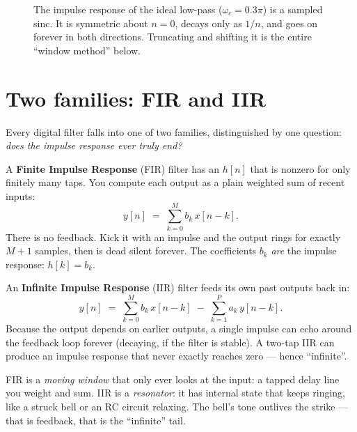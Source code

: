 \begin{figure}[H]
\centering
{}
\caption{The impulse response of the ideal low-pass ($\omega_c = 0.3\pi$) is a
sampled sinc. It is symmetric about $n=0$, decays only as $1/n$, and goes on
forever in both directions. Truncating and shifting it is the entire ``window
method'' below.}
\label{ch16:fig-ideal-sinc}
\end{figure}

\section{Two families: FIR and IIR}
\label{ch16:fir-iir}

Every digital filter falls into one of two families, distinguished by one
question: \emph{does the impulse response ever truly end?}

A \textbf{Finite Impulse Response} (FIR) filter has an $h[n]$ that is nonzero for
only finitely many taps. You compute each output as a plain weighted sum of recent
inputs:
\[
y[n] \;=\; \sum_{k=0}^{M} b_k\, x[n-k].
\]
There is no feedback. Kick it with an impulse and the output rings for exactly
$M+1$ samples, then is dead silent forever. The coefficients $b_k$ \emph{are} the
impulse response: $h[k] = b_k$.

An \textbf{Infinite Impulse Response} (IIR) filter feeds its own past outputs
back in:
\[
y[n] \;=\; \sum_{k=0}^{M} b_k\, x[n-k] \;-\; \sum_{k=1}^{P} a_k\, y[n-k].
\]
Because the output depends on earlier outputs, a single impulse can echo around
the feedback loop forever (decaying, if the filter is stable). A two-tap IIR can
produce an impulse response that never exactly reaches zero --- hence
``infinite''.

\begin{intuitionbox}
FIR is a \emph{moving window} that only ever looks at the input: a tapped delay
line you weight and sum. IIR is a \emph{resonator}: it has internal state that
keeps ringing, like a struck bell or an RC circuit relaxing. The bell's tone
outlives the strike --- that is feedback, that is the ``infinite'' tail.
\end{intuitionbox}

